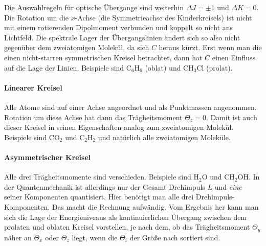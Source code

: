 Die Auswahlregeln für optische Übergange sind weiterhin $\Delta J = \pm 1$ und $\Delta K = 0$. Die Rotation um die $x$-Achse (die Symmetrieachse des Kinderkreisels) ist nicht mit einem rotierenden Dipolmoment verbunden und koppelt so nicht ans Lichtfeld. Die spektrale Lager der Übergangslinien ändert sich so also nicht gegenüber dem zweiatomigen Molekül, da sich $C$ heraus kürzt. Erst wenn man die einen nicht-starren symmetrischen Kreisel betrachtet, dann hat $C$ einen Einfluss auf die Lage der Linien. Beispiele sind C$_6$H$_6$ (oblat) und CH$_3$Cl (prolat).

\paragraph{Linearer Kreisel} Alle Atome sind auf einer Achse angeordnet und als Punktmassen angenommen. Rotation um diese Achse hat dann das Trägheitsmoment $\Theta_z = 0$. Damit ist auch dieser Kreisel in seinen Eigenschaften analog zum zweiatomigen Molekül. Beispiele sind CO$_2$ und C$_2$H$_2$ und natürlich alle zweiatomigen Moleküle.

\paragraph{Asymmetrischer Kreisel} Alle drei Trägheitsmomente sind verschieden. Beispiele sind H$_2$O und CH$_2$OH. In der Quantenmechanik ist allerdings nur der Gesamt-Drehimpuls $L$ und \emph{eine} seiner Komponenten quantisiert. Hier benötigt man alle drei Drehimpuls-Komponenten. Das macht die Rechnung aufwändig. Vom Ergebnis her kann man sich die Lage der Energieniveaus als kontinuierlichen Übergang zwischen dem prolaten und oblaten Kreisel vorstellen, je nach dem, ob das Trägheitsmoment $\Theta_y$ näher an $\Theta_x$ oder $\Theta_z$ liegt, wenn die $\Theta_i$ der Größe nach sortiert sind.







\printbibliography[segment=\therefsegment,heading=subbibliography]
